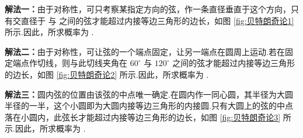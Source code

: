 \begin{solution}

    \textbf{解法一：}由于对称性，可只考察某指定方向的弦，作一条直径垂直于这个方向，只有交直径于  与  之间的弦才能超过内接等边三角形的边长，如图 \ref{fig:贝特朗奇论1} 所示.因此，所求概率为 .

    \textbf{解法二：}由于对称性，可让弦的一个端点固定，让另一端点在圆周上运动.若在固定端点作切线，则与此切线夹角在 $60^{\circ}$ 与 $120^{\circ}$ 之间的弦才能超过内接等边三角形的边长，如图 \ref{fig:贝特朗奇论2} 所示.因此，所求概率为 .

    \textbf{解法三：}圆内弦的位置由该弦的中点唯一确定.在圆内作一同心圆，其半径为大圆半径的一半，这个小圆即为大圆内接等边三角形的内接圆.只有大圆上的弦的中点落在小圆内，此弦长才能超过内接等边三角形的边长，如图 \ref{fig:贝特朗奇论3} 所示.因此，所求概率为 .

    \begin{figure}[H]
        \centering


\end{figure}
\end{solution}
